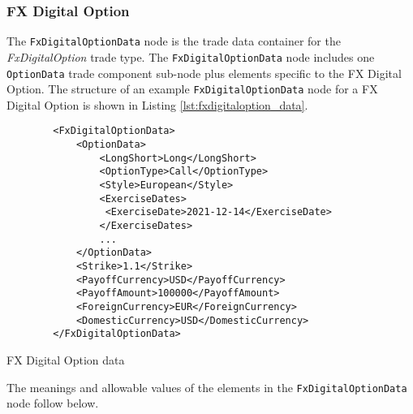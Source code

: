 \subsubsection{FX Digital Option}

\ifdefined{}\fi

The \lstinline!FxDigitalOptionData!  node is the trade data container for the \emph{FxDigitalOption} trade type.   The \lstinline!FxDigitalOptionData!  node includes one  \lstinline!OptionData! trade component sub-node  plus elements
specific to the FX Digital  Option. The structure of an example \lstinline!FxDigitalOptionData! node for a FX Digital  Option is shown in Listing
\ref{lst:fxdigitaloption_data}.

\begin{listing}[H]
\begin{verbatim}
        <FxDigitalOptionData>
            <OptionData>
                <LongShort>Long</LongShort>
                <OptionType>Call</OptionType>
                <Style>European</Style>              
                <ExerciseDates>
                 <ExerciseDate>2021-12-14</ExerciseDate>
                </ExerciseDates> 
                ...
            </OptionData>
            <Strike>1.1</Strike>
            <PayoffCurrency>USD</PayoffCurrency>            
            <PayoffAmount>100000</PayoffAmount>            
            <ForeignCurrency>EUR</ForeignCurrency>
            <DomesticCurrency>USD</DomesticCurrency>
        </FxDigitalOptionData>
\end{verbatim}
\caption{FX Digital Option data}
\label{lst:fxdigitaloption_data}
\end{listing}

The meanings and allowable values of the elements in the \lstinline!FxDigitalOptionData!  node follow below.

